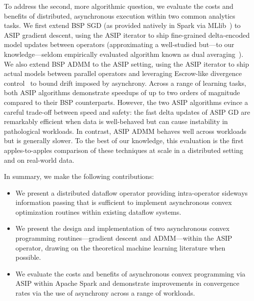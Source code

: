 To address the second, more algorithmic question, we evaluate the
costs and benefits of distributed, asynchronous execution within two
common analytics tasks. We first extend BSP SGD (as provided natively
in Spark via MLlib~\cite{mli}) to ASIP gradient descent, using the
ASIP iterator to ship fine-grained delta-encoded model updates
between operators (approximating a well-studied but---to our
knowledge---seldom empirically evaluated algorithm known as dual
averaging~\cite{dual-averaging}). We also extend BSP ADMM to the ASIP
setting, using the ASIP iterator to ship actual models between
parallel operators and leveraging Escrow-like divergence
control~\cite{escrow,olston-thesis} to bound drift imposed by
asynchrony.  Across a range of learning tasks, both ASIP algorithms
demonstrate speedups of up to two orders of magnitude compared to
their BSP counterparts. However, the two ASIP algorithms evince a careful
trade-off between speed and safety: the fast delta updates of ASIP GD
are remarkably efficient when data is well-behaved but can cause
instability in pathological workloads. In contrast, ASIP ADMM behaves
well across workloads but is generally slower. To the best of our
knowledge, this evaluation is the first apples-to-apples comparison of
these techniques at scale in a distributed setting and on real-world
data.

In summary, we make the following contributions:

\begin{itemize}
\item We present a distributed dataflow operator providing
  intra-operator sideways information passing that is sufficient to
  implement asynchronous convex optimization routines within existing
  dataflow systems.

\item We present the design and implementation of two asynchronous
  convex programming routines---gradient descent and ADMM---within the
  ASIP operator, drawing on the theoretical machine learning
  literature when possible.

\item We evaluate the costs and benefits of asynchronous convex
  programming via ASIP within Apache Spark and demonstrate
  improvements in convergence rates via the use of asynchrony across a
  range of workloads.
\end{itemize}


